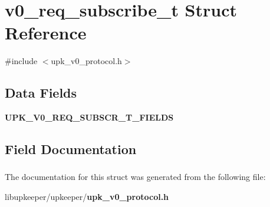 \section{v0\_\-req\_\-subscribe\_\-t Struct Reference}
\label{structv0__req__subscribe__t}


{\ttfamily \#include $<$upk\_\-v0\_\-protocol.h$>$}

\subsection*{Data Fields}
\begin{DoxyCompactItemize}
\item 
{\bf UPK\_\-V0\_\-REQ\_\-SUBSCR\_\-T\_\-FIELDS}
\end{DoxyCompactItemize}


\subsection{Field Documentation}
\subsubsection[{UPK\_\-V0\_\-REQ\_\-SUBSCR\_\-T\_\-FIELDS}]{}\label{structv0__req__subscribe__t_ad19517b75cadef378c7fddf795ddcaca}


The documentation for this struct was generated from the following file:\begin{DoxyCompactItemize}
\item 
libupkeeper/upkeeper/{\bf upk\_\-v0\_\-protocol.h}\end{DoxyCompactItemize}
